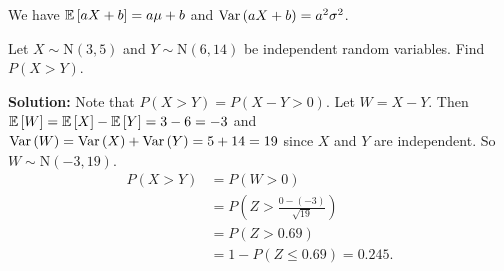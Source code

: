 \begin{note}
    We have $\mathbb{E}\left[{aX+b}\right] = a\mu + b$ and $\operatorname{Var}\left({aX+b}\right) = a^2\sigma^2$. \\
\end{note}

\begin{example}
    Let $X \sim \text{N}(3,5)$ and $Y \sim \text{N}(6,14)$ be independent random variables. Find $P(X > Y)$.

    \textbf{Solution:} Note that $P(X > Y) = P(X - Y > 0)$. Let $W = X - Y$. Then $\mathbb{E}\left[{W}\right] = \mathbb{E}\left[{X}\right] - \mathbb{E}\left[{Y}\right] = 3 - 6 = -3$ and $\operatorname{Var}\left({W}\right) = \operatorname{Var}\left({X}\right) + \operatorname{Var}\left({Y}\right) = 5 + 14 = 19$ since $X$ and $Y$ are independent. So $W \sim \text{N}(-3,19)$. \vspace{-3mm}
    \begin{align*}
        P(X > Y) & = P(W > 0) \\
        &= P(Z > \frac{0-(-3)}{\sqrt{19}}) \\
        &= P(Z > 0.69) \\
        &= 1 - P(Z \leq 0.69) = 0.245.
    \end{align*}
\end{example}

